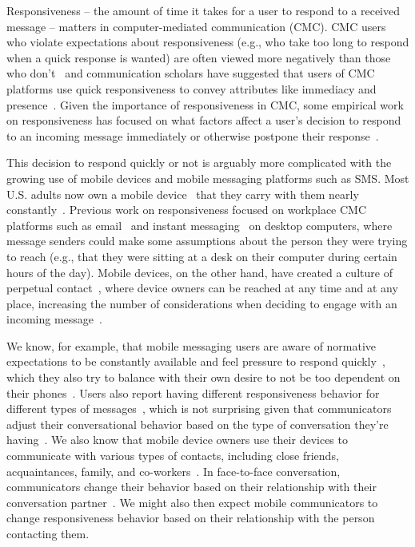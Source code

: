 \documentclass[12pt]{nuthesis}	%
\begin{document}
Responsiveness -- the amount of time it takes for a user to respond to a received message -- matters in computer-mediated communication (CMC). CMC users who violate expectations about responsiveness (e.g., who take too long to respond when a quick response is wanted) are often viewed more negatively than those who don't~\citep{cramton2002attribution,heston2017worth,kalman2011online} and communication scholars have suggested that users of CMC platforms use quick responsiveness to convey attributes like immediacy and presence~\citep{kalman2006pauses,walther1995nonverbal}. Given the importance of responsiveness in CMC, some empirical work on responsiveness has focused on what factors affect a user's decision to respond to an incoming message immediately or otherwise postpone their response~\citep{avrahami2008waiting,dabbish2005understanding}.

This decision to respond quickly or not is arguably more complicated with the growing use of mobile devices and mobile messaging platforms such as SMS. Most U.S. adults now own a mobile device~\citep{anderson2015technology} that they carry with them nearly constantly~\citep{oksman2003perhaps,rainie2015americans,turkle2008always}. Previous work on responsiveness focused on workplace CMC platforms such as email~\citep{dabbish2005understanding,tyler2003can} and instant messaging~\citep{avrahami2008waiting} on desktop computers,  where message senders could make some assumptions about the person they were trying to reach (e.g., that they were sitting at a desk on their computer during certain hours of the day). Mobile devices, on the other hand, have created a culture of perpetual contact~\citep{katz2002perpetual}, where device owners can be reached at any time and at any place, increasing the number of considerations when deciding to engage with an incoming message~\citep{avrahami2007improving,grandhi2010technology}.

We know, for example, that mobile messaging users are aware of normative expectations to be constantly available and feel pressure to respond quickly~\citep{church2013s,rettie2009mobile}, which they also try to balance with their own desire to not be too dependent on their phones~\citep{ames2013managing,hall2012calling}. Users also report having different responsiveness behavior for different types of messages~\citep{cui2016beyond}, which is not surprising given that communicators adjust their conversational behavior based on the type of conversation they're having~\citep{levinson1981essential,sacks1974simplest}. We also know that mobile device owners use their devices to communicate with various types of contacts, including close friends, acquaintances, family, and co-workers~\citep{battestini2010large}. In face-to-face conversation, communicators change their behavior based on their relationship with their conversation partner~\citep{brown1987politeness,locher2005politeness}. We might also then expect mobile communicators to change responsiveness behavior based on their relationship with the person contacting them.
\end{document}
